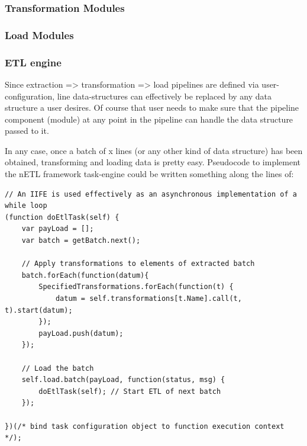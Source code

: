 \subsubsection{Transformation Modules}

\subsubsection{Load Modules}

\subsubsection{ETL engine}
Since extraction => transformation => load pipelines are defined via user-configuration, line data-structures can effectively be replaced by any data structure a user desires. Of course that user needs to make sure that the pipeline component (module) at any point in the pipeline can handle the data structure passed to it.

In any case, once a batch of x lines (or any other kind of data structure) has been obtained, transforming and loading data is pretty easy. Pseudocode to implement the nETL framework task-engine could be written something along the lines of:

\begin{verbatim}
// An IIFE is used effectively as an asynchronous implementation of a while loop
(function doEtlTask(self) {
    var payLoad = [];
    var batch = getBatch.next();

    // Apply transformations to elements of extracted batch
    batch.forEach(function(datum){
        SpecifiedTransformations.forEach(function(t) {
            datum = self.transformations[t.Name].call(t, t).start(datum);
        });
        payLoad.push(datum);
    });

    // Load the batch
    self.load.batch(payLoad, function(status, msg) {
        doEtlTask(self); // Start ETL of next batch
    });

})(/* bind task configuration object to function execution context */);
\end{verbatim}



